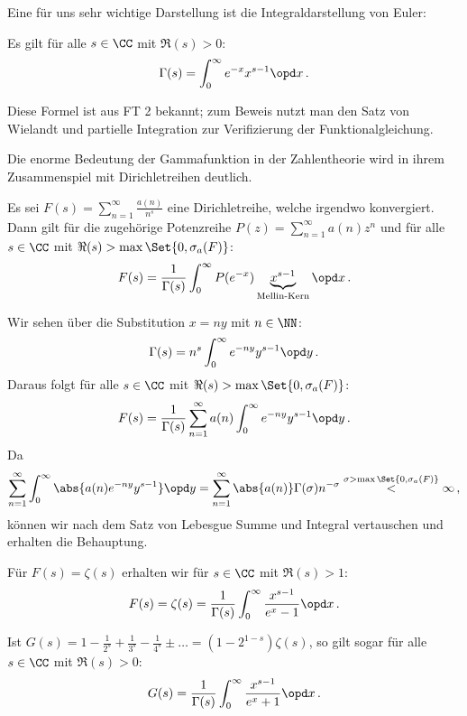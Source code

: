 Eine für uns sehr wichtige Darstellung ist die Integraldarstellung von Euler:

\begin{satz}
Es gilt für alle $s \in \CC$ mit $\Re (s) > 0$:
\[
	\Gamma(s) = \int_0^\infty e^{-x} x^{s-1} \opd x
	\,.
\]
\end{satz}

Diese Formel ist aus FT 2 bekannt; zum Beweis nutzt man den Satz von Wielandt und partielle Integration zur Verifizierung der Funktionalgleichung.

Die enorme Bedeutung der Gammafunktion in der Zahlentheorie wird in ihrem Zusammenspiel mit Dirichletreihen deutlich.

\begin{satz}
Es sei $F(s) = \sum_{n=1}^\infty \frac {a(n)}{n^s}$ eine Dirichletreihe, welche irgendwo konvergiert. Dann gilt für die zugehörige Potenzreihe $P(z) = \sum_{n=1}^\infty a(n) z^n$ und für alle $s \in \CC$ mit $\Re (s) > \max \Set {0, \sigma_a(F)}$:
\[
	F(s) = \frac 1{\Gamma(s)} \int_0^\infty P(e^{-x}) \underbrace{x^{s-1}}_{\text{Mellin-Kern}} \opd x
	\,.
\]
\end{satz}

\begin{bewe}
Wir sehen über die Substitution $x = ny$ mit $n \in \NN$:
\[
	\Gamma(s) = n^s \int_0^\infty e^{-ny} y^{s-1} \opd y
	\,.
\]
Daraus folgt für alle $s \in \CC$ mit $\Re (s) > \max \Set {0, \sigma_a(F)}$:
\[
	F(s) = \frac 1{\Gamma(s)} \sum_{n=1}^\infty a(n) \int_0^\infty e^{-ny} y^{s-1} \opd y
	\,.
\]
Da 
\[
	\sum_{n=1}^\infty \int_0^\infty \abs{a(n) e^{-ny} y^{s-1} } \opd y = \sum_{n=1}^\infty \abs{a(n)} \Gamma(\sigma) n^{-\sigma} \overset {\sigma > \max \Set {0, \sigma_a(F)}}< \infty
	\,,
\]
können wir nach dem Satz von Lebesgue Summe und Integral vertauschen und erhalten die Behauptung.
\end{bewe}

\begin{bsp-list}
\item Für $F(s) = \zeta(s)$ erhalten wir für $s \in \CC$ mit $\Re (s) > 1$:
\[
	F(s) = \zeta(s) = \frac 1{\Gamma(s)} \int_0^\infty \frac {x^{s-1}}{e^x - 1} \opd x
	\,.
\]
\item Ist $G(s) = 1 - \frac 1{2^s} + \frac 1{3^s} - \frac 1{4^s} \pm \ldots = (1 - 2^{1-s}) \zeta(s)$, so gilt sogar für alle $s \in \CC$ mit $\Re (s) > 0$:
\[
	G(s) = \frac 1{\Gamma(s)} \int_0^\infty \frac {x^{s-1}}{e^x + 1} \opd x
	\,.
\]
\end{bsp-list}

